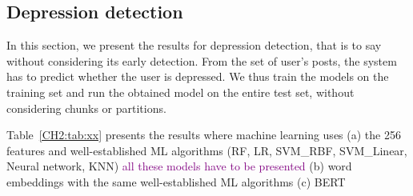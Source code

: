 \documentclass[graybox]{svmult}
\newcommand{\jm}[1]{\textcolor{purple}{{  #1}}}
\begin{document}
\begin{table}[h!]
\caption{\textit{Well-Established machine learning methods using the 256 features} for eRisk 2017 and 2018 collections considering all the  features listed Table~\ref{CH4:tab:features}. Threshold on predicted probability is 0.5.}
{
\centering
{}\label{CH4:tab:erisk_overall}}
\end{table}

\subsection{Depression detection}
In this section, we present the results for depression detection, that is to say without considering its early detection. From the set of user's posts, the system has to predict whether the user is depressed. We thus train the models on the training set and run the obtained model on the entire test set, without considering chunks or partitions.

Table~\ref{CH2:tab:xx} presents the results where machine learning uses (a)  the 256 features and well-established ML algorithms (RF, LR, SVM\_RBF, SVM\_Linear, Neural network, KNN) \jm{all these models have to be presented} (b) word embeddings  with the same well-established ML algorithms (c) BERT 
\end{document}
